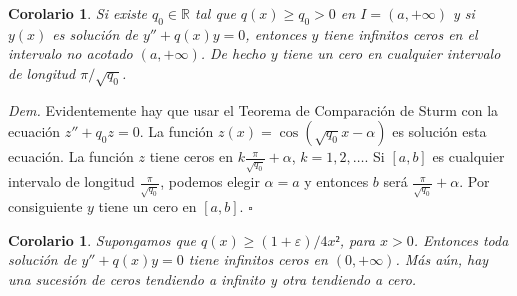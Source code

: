 \documentclass{article}
\newenvironment{demo}{\noindent\emph{Dem.}}{{\hspace*{\fill}$\square$} \newline\vspace{5pt}}
\renewcommand{\epsilon}{\varepsilon}
\newtheorem{corolario}[teorema]{Corolario}
\begin{document}
\begin{corolario} Si existe $q_0\in\mathbb{R}$ tal que  $q(x)\geq q_0>0$ en $I=(a,+\infty)$ y si  $y(x)$ es solución de $y''+q(x)y=0$, entonces $y$ tiene infinitos ceros en el intervalo no acotado $(a,+\infty)$. De hecho $y$ tiene un cero en cualquier intervalo de longitud $\pi/\sqrt{q_0}$.
\end{corolario}
\begin{demo}  Evidentemente hay que usar el Teorema de Comparación de Sturm con la ecuación $z''+q_0z=0$. La función  $z(x)=\cos(\sqrt{q_0}x-\alpha)$ es solución  esta ecuación. La función $z$ tiene ceros en  $k\frac{\pi}{\sqrt{q_0}}+\alpha$, $k=1,2,\ldots$. Si $[a,b]$ es cualquier intervalo de longitud $ \frac{\pi}{\sqrt{q_0}}$, podemos elegir $\alpha=a$ y entonces $b$ será $\frac{\pi}{\sqrt{q_0}}+\alpha$. Por consiguiente $y$ tiene un cero en $[a,b]$.
\end{demo}



\begin{corolario} Supongamos que $q(x)\geq (1+\epsilon)/4x²$, para $x>0$. Entonces toda solución de $y''+q(x)y=0$ tiene infinitos ceros en $(0,+\infty)$. Más aún, hay una sucesión de ceros tendiendo a infinito y otra tendiendo a cero.
\end{corolario}
\end{document}
